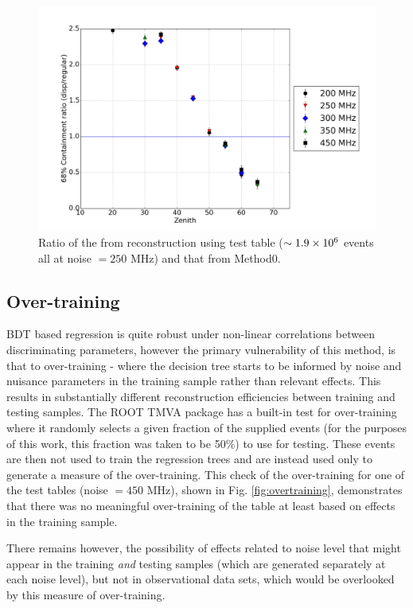 \documentclass[main.tex]{subfiles}
\begin{document}
\begin{figure}[htbp]
  \centering
  \includegraphics[width=0.8\linewidth]{images/disp_250_ratio_xzen}
  \caption[Test \disp table reconstruction (noise = $250$ MHz).]{Ratio of the \rse from reconstruction using test \disp table ($\sim 1.9\times 10^{6}$ events all at noise $= 250$ MHz) and that from Method0.}
  \label{fig:disp_ratio_250}
\end{figure}

\subsection{Over-training}
BDT based regression is quite robust under non-linear correlations between discriminating parameters, however the primary vulnerability of this method, is that  to over-training - where the decision tree starts to be informed by noise and nuisance parameters in the training sample rather than relevant effects. This results in substantially different reconstruction efficiencies between training and testing samples. The ROOT TMVA package has a built-in test for over-training where it randomly selects a given fraction of the supplied events (for the purposes of this work, this fraction was taken to be 50\%) to use for testing. These events are then not used to train the regression trees and are instead used only to generate a measure of the over-training.
This check of the over-training for one of the test tables (noise $= 450$ MHz), shown in Fig. \ref{fig:overtraining}, demonstrates that there was no meaningful over-training of the table at least based on effects in the training sample.

There remains however, the possibility of effects related to noise level that might appear in the training \textit{and} testing samples (which are generated separately at each noise level), but not in observational data sets, which would be overlooked by this measure of over-training.
\end{document}
